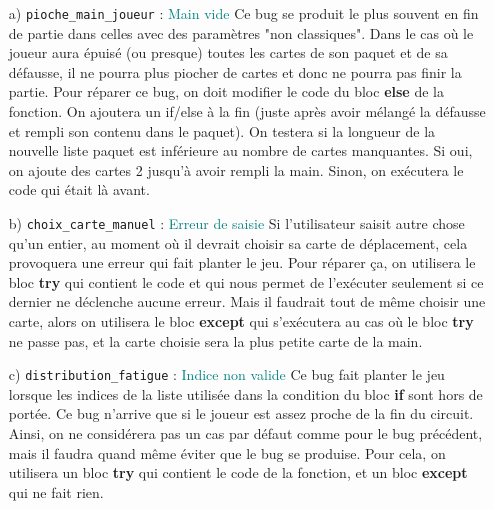 \documentclass{article}
\begin{document}
\begin{itemize}

\item[a)] \texttt{pioche\_main\_joueur} : \textcolor{teal}{Main vide} \newline \small
Ce bug se produit le plus souvent en fin de partie dans celles avec des paramètres "non classiques". Dans le cas où le joueur aura épuisé (ou presque) toutes les cartes de son paquet et de sa défausse, il ne pourra plus piocher de cartes et donc ne pourra pas finir la partie. Pour réparer ce bug, on doit modifier le code du bloc \textbf{else} de la fonction. On ajoutera un if/else à la fin (juste après avoir mélangé la défausse et rempli son contenu dans le paquet). On testera si la longueur de la nouvelle liste paquet est inférieure au nombre de cartes manquantes. Si oui, on ajoute des cartes 2 jusqu'à avoir rempli la main. Sinon, on exécutera le code qui était là avant. \newline \normalsize

\item[b)] \texttt{choix\_carte\_manuel} : \textcolor{teal}{Erreur de saisie} \newline \small
Si l'utilisateur saisit autre chose qu'un entier, au moment où il devrait choisir sa carte de déplacement, cela provoquera une erreur qui fait planter le jeu. Pour réparer ça, on utilisera le bloc \textbf{try} qui contient le code et qui nous permet de l'exécuter seulement si ce dernier ne déclenche aucune erreur. Mais il faudrait tout de même choisir une carte, alors on utilisera le bloc \textbf{except} qui s'exécutera au cas où le bloc \textbf{try} ne passe pas, et la carte choisie sera la plus petite carte de la main. \newpage \normalsize

\item[c)] \texttt{distribution\_fatigue} : \textcolor{teal}{Indice non valide} \newline \small
Ce bug fait planter le jeu lorsque les indices de la liste utilisée dans la condition du bloc \textbf{if} sont hors de portée. Ce bug n'arrive que si le joueur est assez proche de la fin du circuit. Ainsi, on ne considérera pas un cas par défaut comme pour le bug précédent, mais il faudra quand même éviter que le bug se produise. Pour cela, on utilisera un bloc \textbf{try} qui contient le code de la fonction, et un bloc \textbf{except} qui ne fait rien. \newline \normalsize

\end{itemize}
\end{document}

